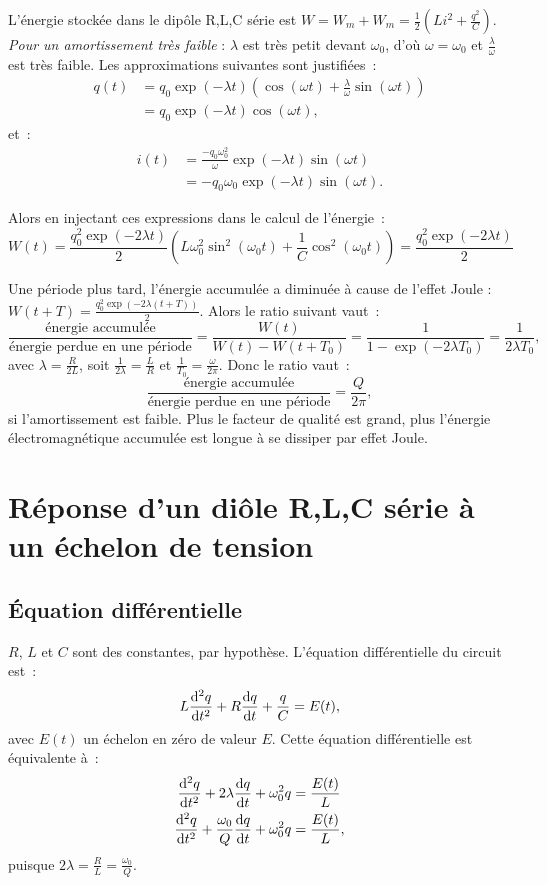 L'énergie stockée dans le dipôle R,L,C série est $W = W_m + W_m = \frac{1}{2}\left(Li^2 + \frac{q^2}{C}\right)$. \emph{Pour un amortissement très faible} : $\lambda$ est très petit devant $\omega_0$, d'où $\omega = \omega_0$ et $\frac{\lambda}{\omega}$ est très faible. Les approximations suivantes sont justifiées~:
\begin{align}
q(t) &= q_0 \exp(-\lambda t)\left(\cos(\omega t) + \frac{\lambda}{\omega} \sin(\omega t)\right) \\
&= q_0 \exp(-\lambda t) \cos(\omega t),
\end{align}
et~:
\begin{align}
i(t) &= \frac{-q_0\omega_0^2}{\omega}\exp(-\lambda t) \sin(\omega t) \\
&=-q_0 \omega_0 \exp(-\lambda t) \sin(\omega t).
\end{align}

Alors en injectant ces expressions dans le calcul de l'énergie~:
\begin{equation}
W(t) = \frac{q_0^2 \exp(-2\lambda t)}{2} \left(L\omega_0^2 \sin^2(\omega_0 t) + \frac{1}{C}\cos^2(\omega_0 t)\right) = \frac{q_0^2 \exp(-2\lambda t)}{2}
\end{equation}

Une période plus tard, l'énergie accumulée a diminuée à cause de l'effet Joule : $W(t+T) = \frac{q_0^2 \exp(-2\lambda (t+T))}{2}$. Alors le ratio suivant vaut~:
\begin{equation}
\frac{\text{énergie accumulée}}{\text{énergie perdue en une période}} = \frac{W(t)}{W(t) - W(t+T_0)} = \frac{1}{1 - \exp(-2\lambda T_0)} = \frac{1}{2\lambda T_0},
\end{equation}
avec $\lambda = \frac{R}{2L}$, soit $\frac{1}{2\lambda}=\frac{L}{R}$ et $\frac{1}{T_0} = \frac{\omega}{2\pi}$. Donc le ratio vaut~:
\begin{equation}
\frac{\text{énergie accumulée}}{\text{énergie perdue en une période}} = \frac{Q}{2\pi},
\end{equation}
si l'amortissement est faible. Plus le facteur de qualité est grand, plus l'énergie électromagnétique accumulée est longue à se dissiper par effet Joule.
\section{Réponse d'un diôle R,L,C série à un échelon de tension}
\subsection{Équation différentielle}
$R$, $L$ et $C$ sont des constantes, par hypothèse. L'équation différentielle du circuit est~:
\begin{equation}
L\dfrac{\mathrm{d}^2 q}{\mathrm{d} {t}^2} +R\dfrac{\mathrm{d} q}{\mathrm{d} t} +\frac{q}{C} = E(t),
\end{equation}
avec $E(t)$ un échelon en zéro de valeur $E$. Cette équation différentielle est équivalente à~:
\begin{align}
\dfrac{\mathrm{d}^2 q}{\mathrm{d} {t}^2} + 2\lambda\dfrac{\mathrm{d} q}{\mathrm{d} t} + \omega_0^2 q &= \frac{E(t)}{L} \\
\dfrac{\mathrm{d}^2 q}{\mathrm{d} {t}^2} + \frac{\omega_0}{Q}\dfrac{\mathrm{d} q}{\mathrm{d} t} + \omega_0^2 q &= \frac{E(t)}{L},
\end{align}
puisque $2\lambda = \frac{R}{L} = \frac{\omega_0}{Q}$.


